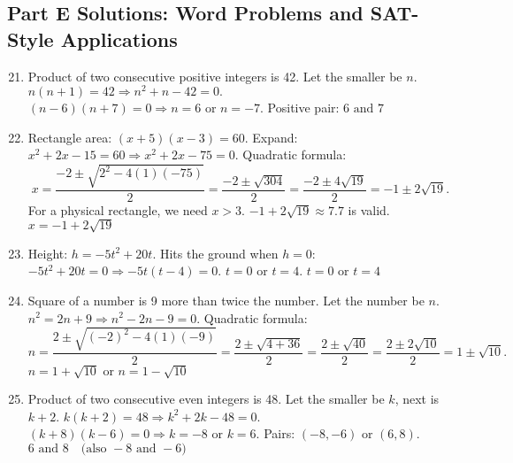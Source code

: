 \documentclass[12pt]{article}
\begin{document}
\subsection*{Part E Solutions: Word Problems and SAT-Style Applications}
\begin{enumerate}
  \setcounter{enumi}{20}
  \item Product of two consecutive positive integers is 42.  
  Let the smaller be \(n\).  
  \(n(n+1) = 42 \Rightarrow n^2 + n - 42 = 0.\)  
  \((n - 6)(n + 7) = 0 \Rightarrow n = 6 \text{ or } n = -7.\)  
  Positive pair: \(\boxed{6 \text{ and } 7}\)

  \item Rectangle area: \((x + 5)(x - 3) = 60.\)  
  Expand: \(x^2 + 2x - 15 = 60 \Rightarrow x^2 + 2x - 75 = 0.\)  
  Quadratic formula:
  \[
  x = \frac{-2 \pm \sqrt{2^2 - 4(1)(-75)}}{2}
  = \frac{-2 \pm \sqrt{304}}{2}
  = \frac{-2 \pm 4\sqrt{19}}{2}
  = -1 \pm 2\sqrt{19}.
  \]
  For a physical rectangle, we need \(x > 3\).  
  \(-1 + 2\sqrt{19} \approx 7.7\) is valid.  
  \(\boxed{x = -1 + 2\sqrt{19}}\)

  \item Height: \(h = -5t^2 + 20t.\)  
  Hits the ground when \(h = 0\):  
  \(-5t^2 + 20t = 0 \Rightarrow -5t(t - 4) = 0.\)  
  \(t = 0\) or \(t = 4.\)  
  \(\boxed{t = 0 \text{ or } t = 4}\)

  \item Square of a number is 9 more than twice the number.  
  Let the number be \(n\).  
  \(n^2 = 2n + 9 \Rightarrow n^2 - 2n - 9 = 0.\)  
  Quadratic formula:
  \[
  n = \frac{2 \pm \sqrt{(-2)^2 - 4(1)(-9)}}{2}
  = \frac{2 \pm \sqrt{4 + 36}}{2}
  = \frac{2 \pm \sqrt{40}}{2}
  = \frac{2 \pm 2\sqrt{10}}{2}
  = 1 \pm \sqrt{10}.
  \]
  \(\boxed{n = 1 + \sqrt{10} \text{ or } n = 1 - \sqrt{10}}\)

  \item Product of two consecutive even integers is 48.  
  Let the smaller be \(k\), next is \(k + 2.\)  
  \(k(k+2) = 48 \Rightarrow k^2 + 2k - 48 = 0.\)  
  \((k + 8)(k - 6) = 0 \Rightarrow k = -8 \text{ or } k = 6.\)  
  Pairs: \((-8, -6)\) or \((6, 8).\)  
  \(\boxed{6 \text{ and } 8 \quad \text{(also } -8 \text{ and } -6\text{)}}\)
\end{enumerate}
\end{document}

